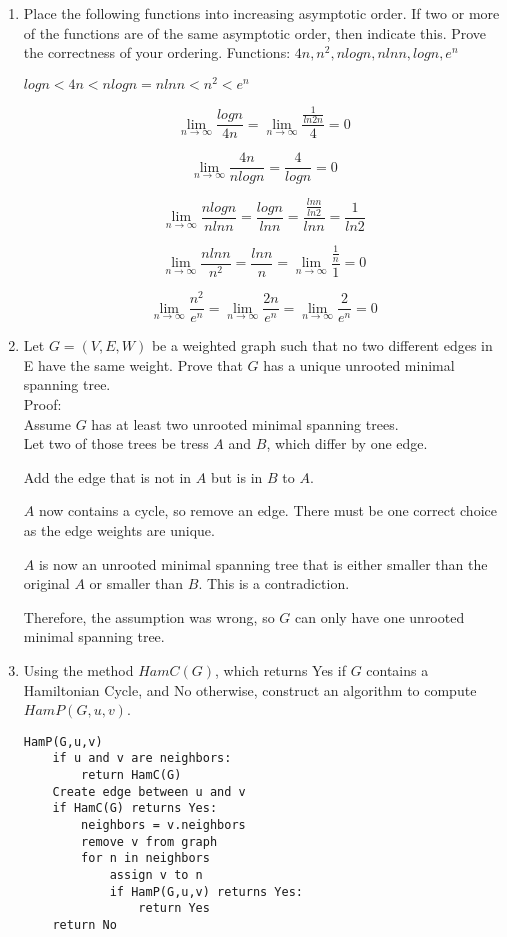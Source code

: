 \documentclass[12pt]{article}
\begin{document}
\begin{enumerate}
\begin{itemize}
\end{itemize}


\item Place the following functions into increasing asymptotic order. If two
or more of the functions are of the same asymptotic order, then indicate this.
Prove the correctness of your ordering.
Functions: $4n, n^2, nlogn, nlnn, logn, e^n$

$logn < 4n < nlogn = nlnn < n^2 < e^n$


$$\lim_{n\to\infty} \frac{logn}{4n} = \lim_{n\to\infty} \frac{\frac{1}{ln2n}}{4} = 0$$

$$\lim_{n\to\infty} \frac{4n}{nlogn} = \frac{4}{logn} = 0$$

$$\lim_{n\to\infty} \frac{nlogn}{nlnn} = \frac{logn}{lnn} =
\frac{\frac{lnn}{ln2}}{lnn} = \frac{1}{ln2}$$

$$\lim_{n\to\infty} \frac{nlnn}{n^2} = \frac{lnn}{n} = \lim_{n\to\infty}
\frac{\frac{1}{n}}{1} = 0$$

$$\lim_{n\to\infty} \frac{n^2}{e^n} = \lim_{n\to\infty} \frac{2n}{e^n} = 
\lim_{n\to\infty} \frac{2}{e^n} = 0$$


\item Let $G = (V,E,W)$ be a weighted graph such that no two different edges
in E have the same weight. Prove that $G$ has a unique unrooted minimal spanning
tree.\\
Proof:\\
Assume $G$ has at least two unrooted minimal spanning trees.\\
Let two of those trees be tress $A$ and $B$, which differ by one
edge.

Add the edge that is not in $A$ but is in $B$ to $A$.

$A$ now contains a cycle, so remove an edge. There must be one
correct choice as the edge weights are unique.

$A$ is now an unrooted minimal spanning tree that is either
smaller than the original $A$ or smaller than $B$. This is a contradiction.

Therefore, the assumption was wrong, so $G$ can only have one
unrooted minimal spanning tree.


\item Using the method $HamC(G)$, which returns Yes if $G$ contains a
Hamiltonian Cycle, and No otherwise, construct an algorithm to compute
$HamP(G,u,v)$.

\begin{lstlisting}
HamP(G,u,v)
    if u and v are neighbors:
        return HamC(G)
    Create edge between u and v
    if HamC(G) returns Yes:
        neighbors = v.neighbors
        remove v from graph
        for n in neighbors
            assign v to n
            if HamP(G,u,v) returns Yes:
                return Yes
    return No

\end{lstlisting}

\end{enumerate}
\end{document}
